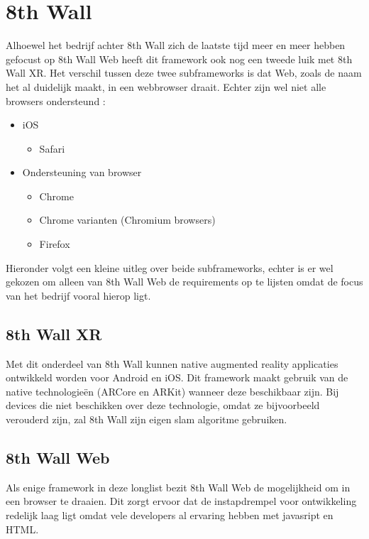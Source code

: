 \section{8th Wall}
Alhoewel het bedrijf achter 8th Wall zich de laatste tijd meer en meer hebben gefocust op 8th Wall Web heeft dit framework ook nog een tweede luik met 8th Wall XR. Het verschil tussen deze twee subframeworks is dat Web, zoals de naam het al duidelijk maakt, in een webbrowser draait. Echter zijn wel niet alle browsers ondersteund \autocite{8thWallWebReq}:
\begin{itemize}
    \item iOS
    \begin{itemize}
        \item Safari
    \end{itemize}
    \item Ondersteuning van browser
    \begin{itemize}
        \item Chrome
        \item Chrome varianten (Chromium browsers)
        \item Firefox
    \end{itemize}
\end{itemize} 


Hieronder volgt een kleine uitleg over beide subframeworks, echter is er wel gekozen om alleen van 8th Wall Web de requirements op te lijsten omdat de focus van het bedrijf vooral hierop ligt.

\subsection{8th Wall XR}
Met dit onderdeel van 8th Wall kunnen native augmented reality applicaties ontwikkeld worden voor Android en iOS. Dit framework maakt gebruik van de native technologieën (ARCore en ARKit) wanneer deze beschikbaar zijn. Bij devices die niet beschikken over deze technologie, omdat ze bijvoorbeeld verouderd zijn, zal 8th Wall zijn eigen \acrshort{slam} algoritme gebruiken.

\subsection{8th Wall Web}
Als enige framework in deze longlist bezit 8th Wall Web de mogelijkheid om in een browser te draaien. Dit zorgt ervoor dat de instapdrempel voor ontwikkeling redelijk laag ligt omdat vele developers al ervaring hebben met javasript en HTML.


